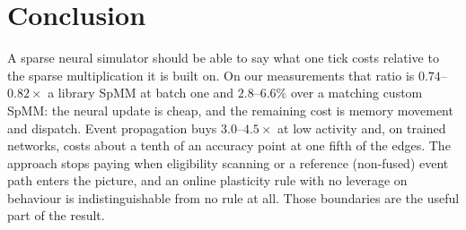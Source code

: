 \documentclass[11pt]{article}
\begin{document}
\section{Conclusion}

A sparse neural simulator should be able to say what one tick costs relative to
the sparse multiplication it is built on. On our measurements that ratio is
$0.74$--$0.82\times$ a library SpMM at batch one and $2.8$--$6.6\%$ over a
matching custom SpMM: the neural update is cheap, and the remaining cost is
memory movement and dispatch. Event propagation buys $3.0$--$4.5\times$ at low
activity and, on trained networks, costs about a tenth of an accuracy point at
one fifth of the edges. The approach stops paying when eligibility scanning or a
reference (non-fused) event path enters the picture, and an online plasticity
rule with no leverage on behaviour is indistinguishable from no rule at all.
Those boundaries are the useful part of the result.



\end{document}
